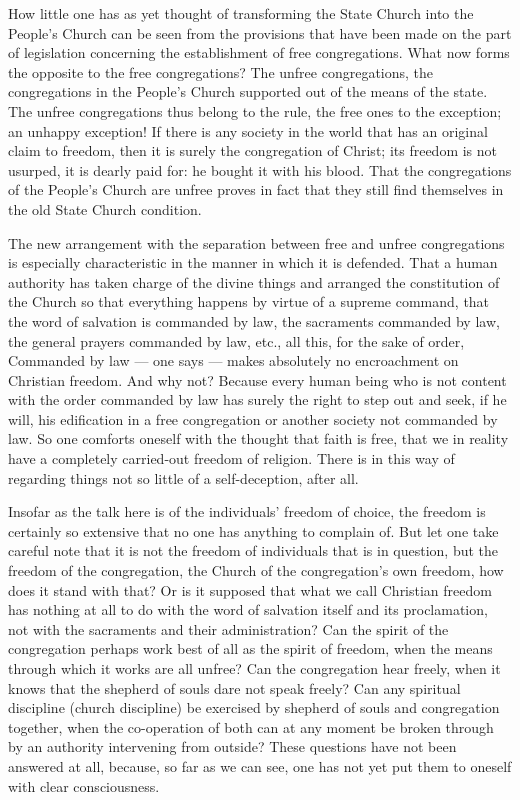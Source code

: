 \documentclass[12pt,a4paper,openany]{book}
\newcommand{\opage}[1]{\marginnote{\footnotesize\textit{[#1]}}}
\begin{document}
How little one has as yet thought of transforming
the State Church into the People's Church can be seen from the provisions
that have been made on the part of legislation concerning the establishment
of free congregations. What now forms the opposite
to the free congregations? The unfree congregations,
the congregations in the People's Church supported out of the means of the state.
The unfree congregations thus belong to the rule,
the free ones to the exception; an unhappy exception!
If there is any society in the world that has an original
claim to freedom, then it is surely the congregation of Christ;
its freedom is not usurped, it is dearly paid for: he
bought it with his blood. That the congregations of the People's Church
are unfree proves in fact that they still find
themselves in the old State Church condition.

The new arrangement with the separation between
\setcounter{footnote}{0}%
\opage{114}free and unfree congregations is especially characteristic in
the manner in which it is defended. That a human
authority has taken charge of the divine
things and arranged the constitution of the Church so that everything
happens by virtue of a supreme command, that the word of salvation
is commanded by law, the sacraments commanded by law, the general
prayers commanded by law, etc., all this, for the sake of order,
Commanded by law --- one says --- makes absolutely no
encroachment on Christian freedom. And why not?
Because every human being who is not content with the
order commanded by law has surely the right to step out and
seek, if he will, his edification in a free congregation
or another society not commanded by law. So one comforts
oneself with the thought that faith is free, that we in reality
have a completely carried-out freedom of religion. There
is in this way of regarding things not so little
of a self-deception, after all.

Insofar as the talk here is of the individuals' freedom of choice,
the freedom is certainly so extensive that no one has
anything to complain of. But let one take careful note
that it is not the freedom of individuals that is in question,
but the freedom of the congregation, the Church of the congregation's own
freedom, how does it stand with that? Or is it supposed that
what we call Christian freedom has nothing at all to do
with the word of salvation itself and its proclamation, not with the sacraments
and their administration? Can the spirit of the congregation
perhaps work best of all as the spirit of freedom,
when the means through which it works are all unfree?
Can the congregation hear freely, when it knows that the shepherd of souls
dare not speak freely? Can any spiritual
discipline (church discipline) be exercised by shepherd of souls and congregation
together, when the co-operation of both can at any moment be
\setcounter{footnote}{0}%
\opage{115}broken through by an authority intervening from outside?
These questions have not been answered at all,
because, so far as we can see, one has not yet put
them to oneself with clear consciousness.
\end{document}
